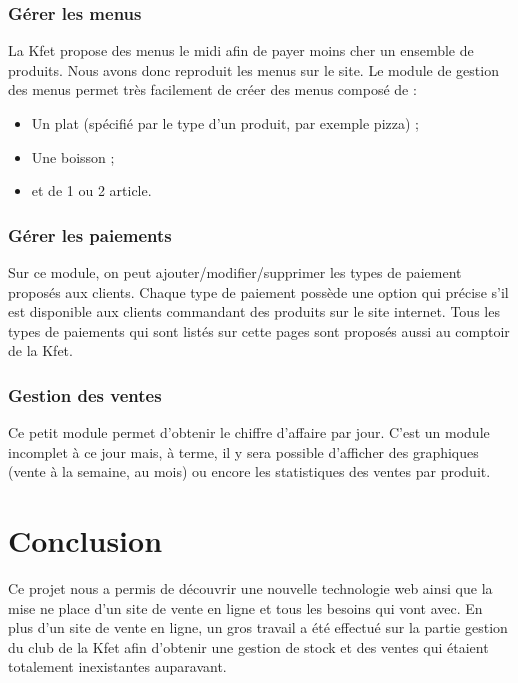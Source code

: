 \documentclass[twoside,UTF8]{EPURapport}
\begin{document}
    \subsection{Gérer les menus}
La Kfet propose des menus le midi afin de payer moins cher un ensemble de produits. Nous avons donc reproduit les menus
sur le site. Le module de gestion des menus permet très facilement de créer des menus composé de :
\begin{itemize}
    \item Un plat (spécifié par le type d'un produit, par exemple pizza) ;
    \item Une boisson ;
    \item et de 1 ou 2 article.
\end{itemize}

    \subsection{Gérer les paiements}
Sur ce module, on peut ajouter/modifier/supprimer les types de paiement proposés aux clients. Chaque type de paiement
possède une option qui précise s'il est disponible aux clients commandant des produits sur le site internet. Tous les
types de paiements qui sont listés sur cette pages sont proposés aussi au comptoir de la Kfet.

    \subsection{Gestion des ventes}
Ce petit module permet d'obtenir le chiffre d'affaire par jour. C'est un module incomplet à ce jour mais, à terme, il y sera possible d'afficher des graphiques (vente à la semaine, au mois) ou encore les statistiques des ventes par produit.


\chapter{Conclusion}

Ce projet nous a permis de découvrir une nouvelle technologie web ainsi que la mise ne place d'un site de vente en ligne et tous les besoins qui vont avec. En plus d'un site de vente en ligne, un gros travail a été effectué sur la partie gestion du club de la Kfet afin d'obtenir une gestion de stock et des ventes qui étaient totalement inexistantes auparavant.
\end{document}
